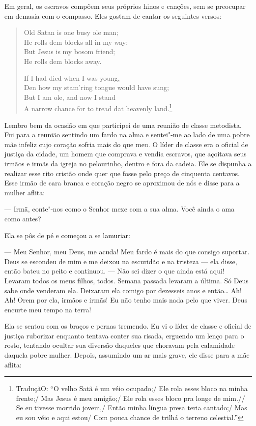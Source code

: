 Em geral, os escravos compõem seus
próprios hinos e canções, sem se preocupar em demasia com o compasso.
Eles gostam de cantar os seguintes versos:

\begin{verse}
Old Satan is one busy ole man;\\
He rolls dem blocks all in my way;\\
But Jesus is my bosom friend;\\
He rolls dem blocks away.

If I had died when I was young,\\
Den how my stam'ring tongue would have \qb sung;\\
But I am ole, and now I stand\\
A narrow chance for to tread dat heavenly \qb land.\footnote{TraduçãO: ``O velho Satã é um
véio ocupado;/ Ele rola esses bloco na minha frente;/ Mas Jesus é meu
amigão;/ Ele rola esses bloco pra longe de mim.//
Se eu tivesse morrido jovem,/ Então minha língua presa
teria cantado;/ Mas eu sou véio e aqui estou/ Com pouca chance de
trilhá o terreno celestial.''}
\end{verse}

Lembro bem da ocasião em que participei
de uma reunião de classe metodista. Fui para a reunião sentindo um fardo
na alma e sentei"-me ao lado de uma pobre mãe infeliz cujo coração sofria
mais do que meu. O líder de classe era o oficial de justiça da cidade,
um homem que comprava e vendia escravos, que açoitava seus irmãos e
irmãs da igreja no pelourinho, dentro e fora da cadeia. Ele se dispunha
a realizar esse rito cristão onde quer que fosse pelo preço de cinquenta
centavos. Esse irmão de cara branca e coração negro se aproximou de nós
e disse para a mulher aflita:

--- Irmã, conte"-nos como o Senhor mexe com a sua alma. Você ainda o ama
como antes?

Ela se pôs de pé e começou a se
lamuriar:

--- Meu Senhor, meu Deus, me acuda! Meu fardo é mais do que consigo
suportar. Deus se escondeu de mim e me deixou na escuridão e na tristeza
--- ela disse, então bateu no peito e continuou. --- Não sei dizer o que
ainda está aqui! Levaram todos os meus filhos, todos. Semana passada
levaram a última. Só Deus sabe onde venderam ela. Deixaram ela comigo
por dezesseis anos e então\ldots{} Ah! Ah! Orem por ela, irmãos e irmãs!
Eu não tenho mais nada pelo que viver. Deus encurte meu tempo na terra!

Ela se sentou com os braços e pernas
tremendo. Eu vi o líder de classe e oficial de justiça ruborizar
enquanto tentava conter sua risada, erguendo um lenço para o rosto,
tentando ocultar sua diversão daqueles que choravam pela calamidade
daquela pobre mulher. Depois, assumindo um ar mais grave, ele disse para
a mãe aflita:

